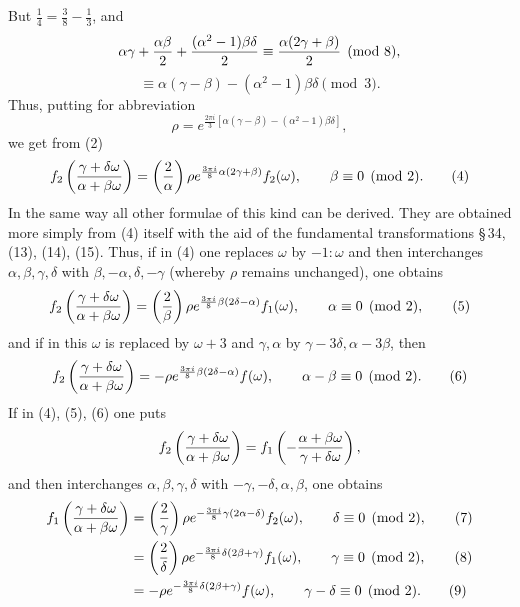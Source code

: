 \documentclass[11pt]{article}
\newcommand{\Jac}[2]{\left(\frac{#1}{#2}\right)}
\begin{document}
But $\frac14=\frac38-\frac13$, and
\[
\alpha\gamma+{\alpha\beta\over2}+{(\alpha^2-1)\beta\delta\over2}
\equiv {\alpha(2\gamma+
\beta)\over2}\pmod 8,
\]
\[
\equiv \alpha(\gamma-\beta)-(\alpha^2-1)\beta\delta\pmod 3.
\]
Thus, putting for abbreviation
\begin{equation}
\rho=e^{\frac{2\pi i}{3}[\alpha(\gamma-\beta)-(\alpha^2-1)\beta\delta]},
\tag{3}
\end{equation}
we get from (2)
\begin{equation}
f_2\left({\gamma+
\delta\omega\over\alpha+
\beta\omega}\right)
=\Jac{2}{\alpha}\rho e^{\frac{3\pi i}{8}\alpha(2\gamma+
\beta)}f_2(\omega),
\qquad \beta\equiv0\pmod2.
\tag{4}
\end{equation}
In the same way all other formulae of this kind can be derived. They are obtained more simply from (4) itself with the aid of the fundamental transformations \S\,34, (13), (14), (15). Thus, if in (4) one replaces $\omega$ by $-1:\omega$ and then interchanges $\alpha,\beta,\gamma,\delta$ with $\beta,-\alpha,\delta,-\gamma$ (whereby $\rho$ remains unchanged), one obtains
\begin{equation}
f_2\left({\gamma+
\delta\omega\over\alpha+
\beta\omega}\right)
=\Jac{2}{\beta}\rho e^{\frac{3\pi i}{8}\beta(2\delta-
\alpha)}f_1(\omega),
\qquad \alpha\equiv0\pmod2,
\tag{5}
\end{equation}
and if in this $\omega$ is replaced by $\omega+3$ and $\gamma,
\alpha$ by $\gamma-3\delta,
\alpha-3\beta$, then
\begin{equation}
f_2\left({\gamma+
\delta\omega\over\alpha+
\beta\omega}\right)
=-\rho e^{\frac{3\pi i}{8}\beta(2\delta-
\alpha)}f(\omega),
\qquad \alpha-
\beta\equiv0\pmod2.
\tag{6}
\end{equation}
If in (4), (5), (6) one puts
\[
f_2\left({\gamma+
\delta\omega\over\alpha+
\beta\omega}\right)
=f_1\left(-{\alpha+
\beta\omega\over\gamma+
\delta\omega}\right),
\]
and then interchanges $\alpha,\beta,\gamma,\delta$ with $-\gamma,-\delta,\alpha,\beta$, one obtains
\begin{align}
f_1\left({\gamma+
\delta\omega\over\alpha+
\beta\omega}\right)
&=\Jac{2}{\gamma}\rho e^{-\frac{3\pi i}{8}\gamma(2\alpha-
\delta)}f_2(\omega),
\qquad \delta\equiv0\pmod2, \tag{7}\\
&=\Jac{2}{\delta}\rho e^{-\frac{3\pi i}{8}\delta(2\beta+
\gamma)}f_1(\omega),
\qquad \gamma\equiv0\pmod2, \tag{8}\\
&=-\rho e^{-\frac{3\pi i}{8}\delta(2\beta+
\gamma)}f(\omega),
\qquad \gamma-
\delta\equiv0\pmod2. \tag{9}
\end{align}
\end{document}
